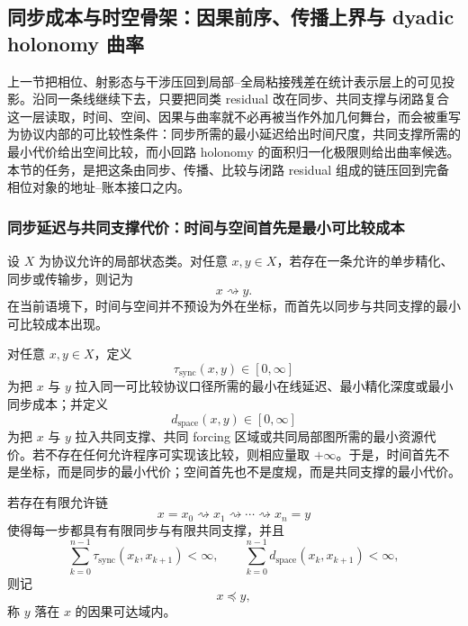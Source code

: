 \subsection{同步成本与时空骨架：因果前序、传播上界与 dyadic holonomy 曲率}\label{subsec:typed-address-biaxial-completion-sync-causal-holonomy}
上一节把相位、射影态与干涉压回到局部--全局粘接残差在统计表示层上的可见投影。沿同一条线继续下去，只要把同类 residual 改在同步、共同支撑与闭路复合这一层读取，时间、空间、因果与曲率就不必再被当作外加几何舞台，而会被重写为协议内部的可比较性条件：同步所需的最小延迟给出时间尺度，共同支撑所需的最小代价给出空间比较，而小回路 holonomy 的面积归一化极限则给出曲率候选。本节的任务，是把这条由同步、传播、比较与闭路 residual 组成的链压回到完备相位对象的地址--账本接口之内。

\subsubsection{同步延迟与共同支撑代价：时间与空间首先是最小可比较成本}\label{subsubsec:typed-address-biaxial-completion-sync-support}
设 \(X\) 为协议允许的局部状态类。对任意 \(x,y\in X\)，若存在一条允许的单步精化、同步或传输步，则记为
\[
x\rightsquigarrow y.
\]
在当前语境下，时间与空间并不预设为外在坐标，而首先以同步与共同支撑的最小可比较成本出现。

\begin{definition}[同步延迟与共同支撑代价]\label{def:typed-address-biaxial-completion-sync-delay-support-cost}
对任意 \(x,y\in X\)，定义
\[
\tau_{\mathrm{sync}}(x,y)\in[0,\infty]
\]
为把 \(x\) 与 \(y\) 拉入同一可比较协议口径所需的最小在线延迟、最小精化深度或最小同步成本；并定义
\[
d_{\mathrm{space}}(x,y)\in[0,\infty]
\]
为把 \(x\) 与 \(y\) 拉入共同支撑、共同 forcing 区域或共同局部图所需的最小资源代价。若不存在任何允许程序可实现该比较，则相应量取 \(+\infty\)。于是，时间首先不是坐标，而是同步的最小代价；空间首先也不是度规，而是共同支撑的最小代价。
\end{definition}

\begin{definition}[因果可达前序]\label{def:typed-address-biaxial-completion-causal-reachability-preorder}
若存在有限允许链
\[
x=x_0\rightsquigarrow x_1\rightsquigarrow\cdots\rightsquigarrow x_n=y
\]
使得每一步都具有有限同步与有限共同支撑，并且
\[
\sum_{k=0}^{n-1}\tau_{\mathrm{sync}}(x_k,x_{k+1})<\infty,
\qquad
\sum_{k=0}^{n-1}d_{\mathrm{space}}(x_k,x_{k+1})<\infty,
\]
则记
\[
x\preceq y,
\]
称 \(y\) 落在 \(x\) 的因果可达域内。
\end{definition}

